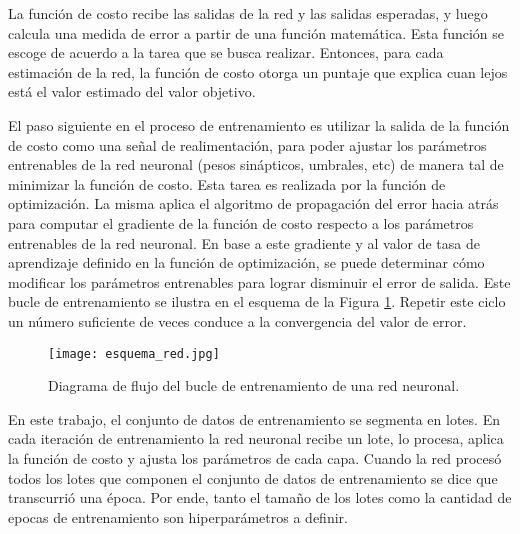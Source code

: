 La función de costo recibe las salidas de la red y las salidas esperadas, y luego calcula una medida de error a partir de una función matemática. Esta función se escoge de acuerdo a la tarea que se busca realizar. Entonces, para cada estimación de la red, la función de costo otorga un puntaje que explica cuan lejos está el valor estimado del valor objetivo.  

El paso siguiente en el proceso de entrenamiento es utilizar la salida de la función de costo como una señal de realimentación, para poder ajustar los parámetros entrenables de la red neuronal (pesos sinápticos, umbrales, etc) de manera tal de minimizar la función de costo. Esta tarea es realizada por la función de optimización. La misma aplica el algoritmo de propagación del error hacia atrás para computar el gradiente de la función de costo respecto a los parámetros entrenables de la red neuronal. En base a este gradiente y al valor de tasa de aprendizaje definido en la función de optimización, se puede determinar cómo modificar los parámetros entrenables para lograr disminuir el error de salida. Este bucle de entrenamiento se ilustra en el esquema de la Figura \ref{fig:esquema}. Repetir este ciclo un número suficiente de veces conduce a la convergencia del valor de error. 

\begin{figure}[H]
  \centering{}
  \texttt{[image: esquema\_red.jpg]}
  \caption{Diagrama de flujo del bucle de entrenamiento de una red neuronal.}
  \label{fig:esquema}
\end{figure}


En este trabajo, el conjunto de datos de entrenamiento se segmenta en lotes. En cada iteración de entrenamiento la red neuronal recibe un lote, lo procesa, aplica la función de costo y ajusta los parámetros de cada capa. Cuando la red procesó todos los lotes que componen el conjunto de datos de entrenamiento se dice que transcurrió una época. Por ende, tanto el tamaño de los lotes como la cantidad de epocas de entrenamiento son hiperparámetros a definir.

